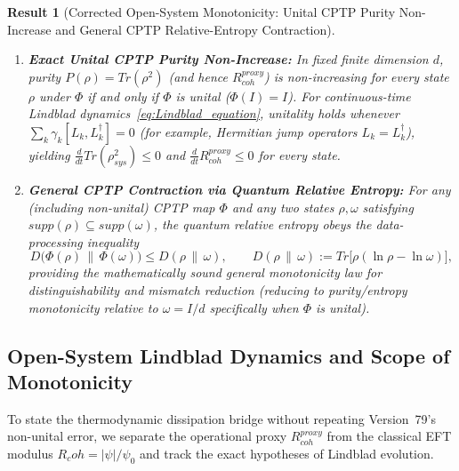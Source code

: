 \documentclass[american,11pt,letterpaper]{article}
\newtheorem{result}{Result}
\newcommand{\Rcoh}{R_{\mathrm{coh}}}
\def\mathrm#1{#1}%
\def\emph#1{#1}%
\def\Rcoh{R_coh}%
\begin{document}
\begin{result}[Corrected Open-System Monotonicity: Unital CPTP Purity Non-Increase and General CPTP Relative-Entropy Contraction]
\begin{enumerate}[leftmargin=2em]
\begin{itemize}
  \end{itemize}
  \item \textbf{Exact Unital CPTP Purity Non-Increase:} In fixed finite dimension $d$, purity $P(\rho) = \mathrm{Tr}(\rho^2)$ (and hence $R_{\mathrm{coh}}^{\mathrm{proxy}}$) is non-increasing for \emph{every} state $\rho$ under $\Phi$ if and only if $\Phi$ is \emph{unital} ($\Phi(I) = I$). For continuous-time Lindblad dynamics~\eqref{eq:Lindblad_equation}, unitality holds whenever $\sum_k \gamma_k [L_k, L_k^\dagger] = 0$ (for example, Hermitian jump operators $L_k = L_k^\dagger$), yielding $\frac{d}{dt}\mathrm{Tr}(\rho_{\mathrm{sys}}^2) \le 0$ and $\frac{d}{dt}R_{\mathrm{coh}}^{\mathrm{proxy}} \le 0$ for every state.
  \item \textbf{General CPTP Contraction via Quantum Relative Entropy:} For \emph{any} (including non-unital) CPTP map $\Phi$ and any two states $\rho, \omega$ satisfying $\mathrm{supp}(\rho) \subseteq \mathrm{supp}(\omega)$, the quantum relative entropy obeys the data-processing inequality
  \begin{equation}
  D\bigl(\Phi(\rho)\,\|\,\Phi(\omega)\bigr) \le D(\rho\,\|\,\omega),
  \qquad
  D(\rho\,\|\,\omega) := \mathrm{Tr}\bigl[\rho(\ln\rho - \ln\omega)\bigr],
  \label{eq:relative_entropy_dpi}
  \end{equation}
  providing the mathematically sound general monotonicity law for distinguishability and mismatch reduction (reducing to purity/entropy monotonicity relative to $\omega = I/d$ specifically when $\Phi$ is unital).
\end{enumerate}
\end{result}

\subsection{Open-System Lindblad Dynamics and Scope of Monotonicity}
\label{sec:CoherenceConservationArrow}
To state the thermodynamic dissipation bridge without repeating Version~79's non-unital error, we separate the operational proxy $R_{\mathrm{coh}}^{\mathrm{proxy}}$ from the classical EFT modulus $\Rcoh = |\psi|/\psi_0$ and track the exact hypotheses of Lindblad evolution.
\end{document}
